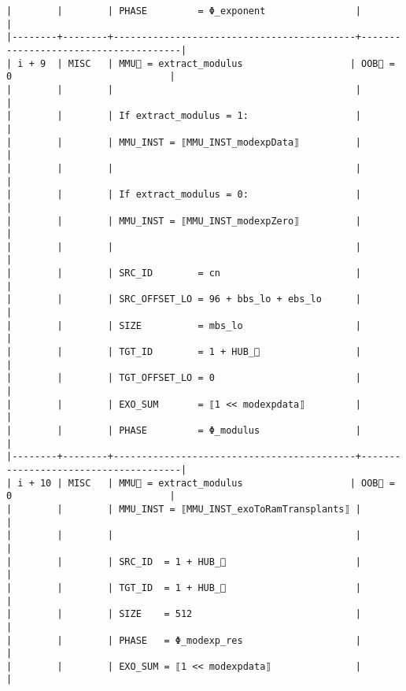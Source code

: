 \documentclass[varwidth=\maxdimen,margin=0.5cm,multi={verbatim}]{standalone}
\begin{document}
\begin{verbatim}
|        |        | PHASE         = Φ_exponent                |                                      |
|--------+--------+-------------------------------------------+--------------------------------------|
| i + 9  | MISC   | MMU🏴 = extract_modulus                   | OOB🏴 = 0                            |
|        |        |                                           |                                      |
|        |        | If extract_modulus = 1:                   |                                      |
|        |        | MMU_INST = ⟦MMU_INST_modexpData⟧          |                                      |
|        |        |                                           |                                      |
|        |        | If extract_modulus = 0:                   |                                      |
|        |        | MMU_INST = ⟦MMU_INST_modexpZero⟧          |                                      |
|        |        |                                           |                                      |
|        |        | SRC_ID        = cn                        |                                      |
|        |        | SRC_OFFSET_LO = 96 + bbs_lo + ebs_lo      |                                      |
|        |        | SIZE          = mbs_lo                    |                                      |
|        |        | TGT_ID        = 1 + HUB_                 |                                      |
|        |        | TGT_OFFSET_LO = 0                         |                                      |
|        |        | EXO_SUM       = ⟦1 << modexpdata⟧         |                                      |
|        |        | PHASE         = Φ_modulus                 |                                      |
|--------+--------+-------------------------------------------+--------------------------------------|
| i + 10 | MISC   | MMU🏴 = extract_modulus                   | OOB🏴 = 0                            |
|        |        | MMU_INST = ⟦MMU_INST_exoToRamTransplants⟧ |                                      |
|        |        |                                           |                                      |
|        |        | SRC_ID  = 1 + HUB_                       |                                      |
|        |        | TGT_ID  = 1 + HUB_                       |                                      |
|        |        | SIZE    = 512                             |                                      |
|        |        | PHASE   = Φ_modexp_res                    |                                      |
|        |        | EXO_SUM = ⟦1 << modexpdata⟧               |                                      |

\end{verbatim}
\end{document}
